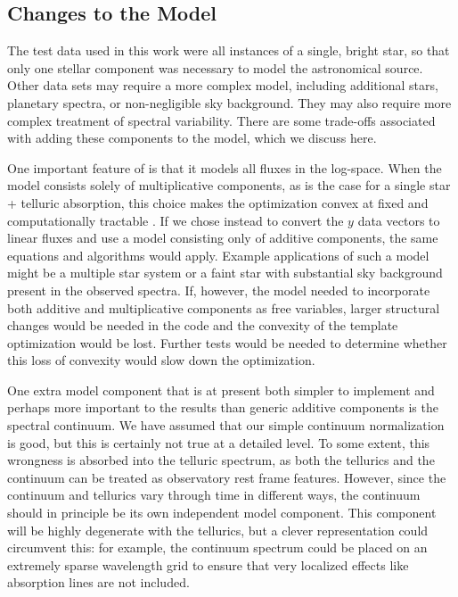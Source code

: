 \documentclass[modern]{aastex62}
\begin{document}
\subsection{Changes to the Model}
\label{s:model-changes}
 
The test data used in this work were all instances of a single, bright star, so that only one stellar component was necessary to model the astronomical source. 
Other data sets may require a more complex model, including additional stars, planetary spectra, or non-negligible sky background. 
They may also require more complex treatment of spectral variability. 
There are some trade-offs associated with adding these components to the model, which we discuss here.

One important feature of \wobble is that it models all fluxes in the log-space. 
When the model consists solely of multiplicative components, as is the case for a single star + telluric absorption, this choice makes the optimization convex at fixed \RV and computationally tractable . 
If we chose instead to convert the $y$ data vectors to linear fluxes and use a model consisting only of additive components, the same equations and algorithms would apply. 
Example applications of such a model might be a multiple star system or a faint star with substantial sky background present in the observed spectra. 
If, however, the model needed to incorporate both additive and multiplicative
components as free variables, larger structural changes would be needed in the code and the convexity of the template optimization would be lost. 
Further tests would be needed to determine whether this loss of convexity would slow down the optimization. 

One extra model component that is at present both simpler to implement and perhaps more important to the results than generic additive components is the spectral continuum. 
We have assumed that our simple continuum normalization is good, but this is certainly not true at a detailed level. 
To some extent, this wrongness is absorbed into the telluric spectrum, as both the tellurics and the continuum can be treated as observatory rest frame features. 
However, since the continuum and tellurics vary through time in different ways, the continuum should in principle be its own independent model component. 
This component will be highly degenerate with the tellurics, but a clever representation could circumvent this: for example, the continuum spectrum could be placed on an extremely sparse wavelength grid to ensure that very localized effects like absorption lines are not included.
\end{document}

